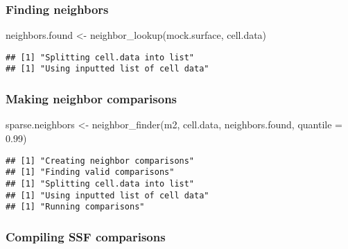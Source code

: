 \documentclass[
]{article}
\newenvironment{Shaded}{\begin{snugshade}}{\end{snugshade}}
\newcommand{\AttributeTok}[1]{\textcolor[rgb]{0.77,0.63,0.00}{#1}}
\newcommand{\FloatTok}[1]{\textcolor[rgb]{0.00,0.00,0.81}{#1}}
\newcommand{\FunctionTok}[1]{\textcolor[rgb]{0.00,0.00,0.00}{#1}}
\newcommand{\NormalTok}[1]{#1}
\newcommand{\OtherTok}[1]{\textcolor[rgb]{0.56,0.35,0.01}{#1}}
\begin{document}
\hypertarget{finding-neighbors-1}{%
\subsubsection{Finding neighbors}\label{finding-neighbors-1}}

\begin{Shaded}
\begin{Highlighting}[]
\NormalTok{neighbors.found }\OtherTok{\textless{}{-}} \FunctionTok{neighbor\_lookup}\NormalTok{(mock.surface, cell.data)}
\end{Highlighting}
\end{Shaded}

\begin{verbatim}
## [1] "Splitting cell.data into list"
## [1] "Using inputted list of cell data"
\end{verbatim}

\hypertarget{making-neighbor-comparisons-1}{%
\subsubsection{Making neighbor
comparisons}\label{making-neighbor-comparisons-1}}

\begin{Shaded}
\begin{Highlighting}[]
\NormalTok{sparse.neighbors }\OtherTok{\textless{}{-}} \FunctionTok{neighbor\_finder}\NormalTok{(m2, cell.data, neighbors.found, }\AttributeTok{quantile =} \FloatTok{0.99}\NormalTok{)}
\end{Highlighting}
\end{Shaded}

\begin{verbatim}
## [1] "Creating neighbor comparisons"
## [1] "Finding valid comparisons"
## [1] "Splitting cell.data into list"
## [1] "Using inputted list of cell data"
## [1] "Running comparisons"
\end{verbatim}

\hypertarget{compiling-ssf-comparisons-1}{%
\subsubsection{Compiling SSF
comparisons}\label{compiling-ssf-comparisons-1}}
\end{document}
